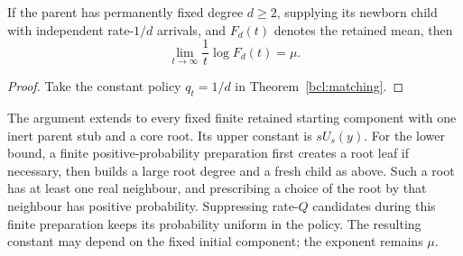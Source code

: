 \begin{corollary}
\label{bcl:fixed-parent}
If the parent has permanently fixed degree $d\ge2$, supplying its
newborn child with independent rate-$1/d$ arrivals, and $F_d(t)$ denotes
the retained mean, then
\[
 \boxed{\lim_{t\to\infty}\frac1t\log F_d(t)=\mu.}
\]
\end{corollary}
\begin{proof}
Take the constant policy $q_t=1/d$ in
Theorem~\ref{bcl:matching}.
\end{proof}

The argument extends to every fixed finite retained starting component
with one inert parent stub and a core root.  Its upper constant is
$sU_s(y)$.  For the lower bound, a finite positive-probability
preparation first creates a root leaf if necessary, then builds a
large root degree and a fresh child as above.  Such a root has at
least one real neighbour, and prescribing a choice of the root by
that neighbour has positive probability.  Suppressing rate-$Q$
candidates during this finite preparation keeps its probability
uniform in the policy.  The resulting constant may depend on the
fixed initial component; the exponent remains $\mu$.

